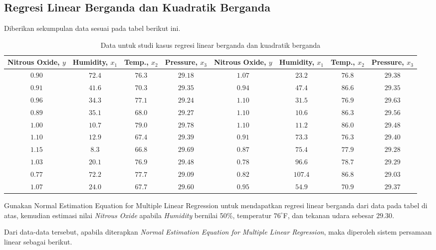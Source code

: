 \pagebreak
\subsection{Regresi Linear Berganda dan Kuadratik Berganda}
Diberikan sekumpulan data sesuai pada tabel berikut ini.\\

\begin{table}[H]
    \centering
    \caption{Data untuk studi kasus regresi linear berganda dan kuadratik berganda}
    \begin{tabular}{cccc|cccc}
        \hline
        \hline
         Nitrous Oxide, $y$ & Humidity, $x_1$ & Temp., $x_2$ & Pressure, $x_3$ &Nitrous Oxide, $y$ & Humidity, $x_1$ & Temp., $x_2$ & Pressure, $x_3$ \\
         \hline
         $0.90$ & $72.4$ & $76.3$ & $29.18$ & $1.07$ & $23.2$  & $76.8$ & $29.38$ \\
         $0.91$ & $41.6$ & $70.3$ & $29.35$ & $0.94$ & $47.4$  & $86.6$ & $29.35$ \\
         $0.96$ & $34.3$ & $77.1$ & $29.24$ & $1.10$ & $31.5$  & $76.9$ & $29.63$ \\
         $0.89$ & $35.1$ & $68.0$ & $29.27$ & $1.10$ & $10.6$  & $86.3$ & $29.56$ \\
         $1.00$ & $10.7$ & $79.0$ & $29.78$ & $1.10$ & $11.2$  & $86.0$ & $29.48$ \\
         $1.10$ & $12.9$ & $67.4$ & $29.39$ & $0.91$ & $73.3$  & $76.3$ & $29.40$ \\
         $1.15$ & $8.3$  & $66.8$ & $29.69$ & $0.87$ & $75.4$  & $77.9$ & $29.28$ \\
         $1.03$ & $20.1$ & $76.9$ & $29.48$ & $0.78$ & $96.6$  & $78.7$ & $29.29$ \\
         $0.77$ & $72.2$ & $77.7$ & $29.09$ & $0.82$ & $107.4$ & $86.8$ & $29.03$ \\
         $1.07$ & $24.0$ & $67.7$ & $29.60$ & $0.95$ & $54.9$  & $70.9$ & $29.37$ 
    \end{tabular}
\end{table}

Gunakan Normal Estimation Equation for Multiple Linear Regression untuk mendapatkan regresi linear berganda dari data pada tabel di atas, kemudian estimasi nilai \textit{Nitrous Oxide} apabila \textit{Humidity} bernilai 50$\%$, temperatur $76^\circ$F, dan tekanan udara sebesar $29.30$. 

Dari data-data tersebut, apabila diterapkan \textit{Normal Estimation Equation for Multiple Linear Regression}, maka diperoleh sistem persamaan linear sebagai berikut.

